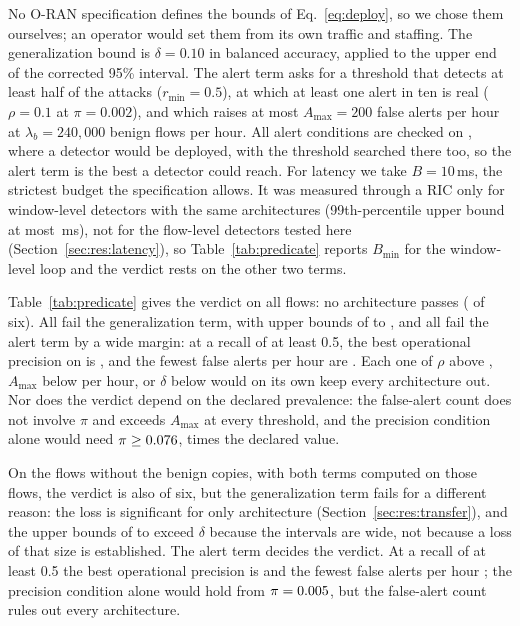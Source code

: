 No O-RAN specification defines the bounds of Eq.~\eqref{eq:deploy}, so we chose them ourselves; an operator would set them from its own traffic and staffing. The generalization bound is $\delta = 0.10$ in balanced accuracy, applied to the upper end of the corrected 95\% interval. The alert term asks for a threshold that detects at least half of the attacks ($r_{\min} = 0.5$), at which at least one alert in ten is real ($\rho = 0.1$ at $\pi = 0.002$), and which raises at most $A_{\max} = 200$ false alerts per hour at $\lambda_{b} = 240{,}000$ benign flows per hour. All alert conditions are checked on \DB{}, where a detector would be deployed, with the threshold searched there too, so the alert term is the best a detector could reach. For latency we take $B = 10$\,ms, the strictest budget the specification allows. It was measured through a RIC only for window-level detectors with the same architectures (99th-percentile upper bound at most \RicLoopTenPnnHiMax{}\,ms), not for the flow-level detectors tested here (Section~\ref{sec:res:latency}), so Table~\ref{tab:predicate} reports $B_{\min}$ for the window-level loop and the verdict rests on the other two terms.

Table~\ref{tab:predicate} gives the verdict on all flows: no architecture passes (\PredPass{} of six). All fail the generalization term, with upper bounds of \PredGenMin{} to \PredGenMax{}, and all fail the alert term by a wide margin: at a recall of at least 0.5, the best operational precision on \DB{} is \PredPPVmax{}, and the fewest false alerts per hour are \PredFAmin{}. Each one of $\rho$ above \PredPPVmax{}, $A_{\max}$ below \PredFAmin{} per hour, or $\delta$ below \PredGenMin{} would on its own keep every architecture out. Nor does the verdict depend on the declared prevalence: the false-alert count does not involve $\pi$ and exceeds $A_{\max}$ at every threshold, and the precision condition alone would need $\pi \ge 0.076$, \PredPiStarRatio{} times the declared value.

On the flows without the benign copies, with both terms computed on those flows, the verdict is also \PredCleanPass{} of six, but the generalization term fails for a different reason: the loss is significant for only \TrCleanSig{} architecture (Section~\ref{sec:res:transfer}), and the upper bounds of \PredCleanGenMin{} to \PredCleanGenMax{} exceed $\delta$ because the intervals are wide, not because a loss of that size is established. The alert term decides the verdict. At a recall of at least 0.5 the best operational precision is \PredCleanPPVmax{} and the fewest false alerts per hour \PredCleanFAmin; the precision condition alone would hold from $\pi = 0.005$, but the false-alert count rules out every architecture.

